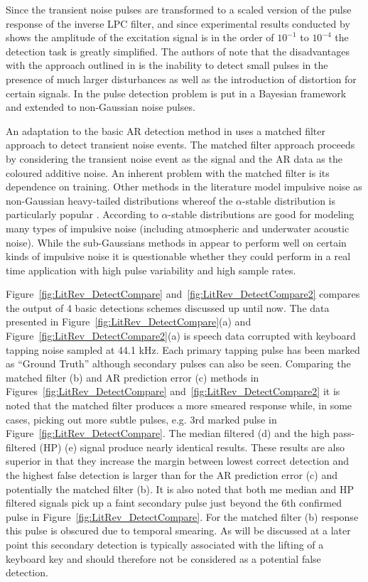 Since the transient noise pulses are transformed to a scaled version of the pulse response of the inverse LPC filter, and since experimental results conducted by \cite{Vaseghi1990} shows the amplitude of the excitation signal is in the order of $10^{-1}$ to $10^{-4}$ the detection task is greatly simplified. The authors of \cite{Godsill1998} note that the disadvantages with the approach outlined in \cite{Vaseghi1990} is the inability to detect small pulses in the presence of much larger disturbances as well as the introduction of distortion for certain signals. In \cite{Godsill1998} the pulse detection problem is put in a Bayesian framework and extended to non-Gaussian noise pulses.

An adaptation to the basic AR detection method in \cite{Vaseghi1988} uses a matched filter approach to detect transient noise events. The matched filter approach proceeds by considering the transient noise event as the signal and the AR data as the coloured additive noise\cite{Godsill1998book}. An inherent problem with the matched filter is its dependence on training. Other methods in the literature model impulsive noise as non-Gaussian heavy-tailed distributions whereof the $\alpha$-stable distribution is particularly popular \cite{Tsihrintzis1997}\cite{Coates2002}. According to \cite{Nikias1995} $\alpha$-stable distributions are good for modeling many types of impulsive noise (including atmospheric and underwater acoustic noise). While the sub-Gaussians methods in \cite{Tsihrintzis1997}\cite{Coates2002} appear to perform well on certain kinds of impulsive noise it is questionable whether they could perform in a real time application with high pulse variability and high sample rates.

Figure~\ref{fig:LitRev_DetectCompare} and~\ref{fig:LitRev_DetectCompare2} compares the output of 4 basic detections schemes discussed up until now. The data presented in Figure~\ref{fig:LitRev_DetectCompare}(a) and Figure~\ref{fig:LitRev_DetectCompare2}(a) is speech data corrupted with keyboard tapping noise sampled at 44.1 kHz. Each primary tapping pulse has been marked as ``Ground Truth'' although secondary pulses can also be seen. Comparing the matched filter (b) and AR prediction error (c) methods in Figures~\ref{fig:LitRev_DetectCompare} and~\ref{fig:LitRev_DetectCompare2} it is noted that the matched filter produces a more smeared response while, in some cases, picking out more subtle pulses\cite{Godsill1998book}, e.g. 3rd marked pulse in Figure~\ref{fig:LitRev_DetectCompare}. The median filtered (d) and the high pass-filtered (HP) (e) signal produce nearly identical results. These results are also superior in that they increase the margin between lowest correct detection and the highest false detection is larger than for the AR prediction error (c) and potentially the matched filter (b). It is also noted that both me median and HP filtered signals pick up a faint secondary pulse just beyond the 6th confirmed pulse in Figure~\ref{fig:LitRev_DetectCompare}. For the matched filter (b) response this pulse is obscured due to temporal smearing. As will be discussed at a later point this secondary detection is typically associated with the lifting of a keyboard key and should therefore not be considered as a potential false detection.

